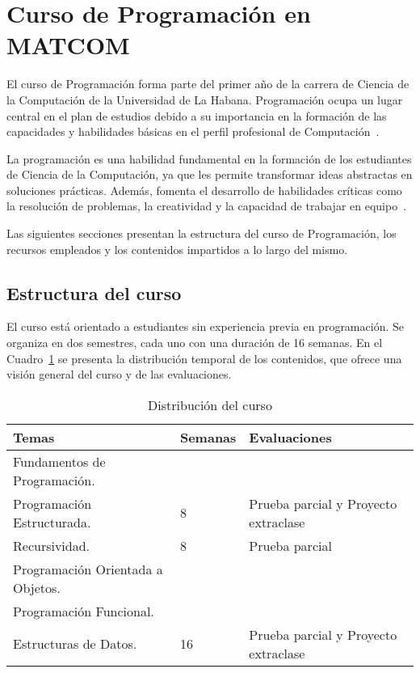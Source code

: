 \section{Curso de Programación en \mbox{MATCOM}}\label{sec:matcom}

El curso de Programación forma parte del primer año de la carrera de Ciencia de la Computación de la Universidad de La Habana. Programación ocupa un lugar central en el plan de estudios debido a su importancia en la formación de las capacidades y habilidades básicas en el perfil profesional de Computación~\cite{plan_estudio_e_2017}.

La programación es una habilidad fundamental en la formación de los estudiantes de Ciencia de la Computación, ya que les permite transformar ideas abstractas en soluciones prácticas. Además, fomenta el desarrollo de habilidades críticas como la resolución de problemas, la creatividad y la capacidad de trabajar en equipo~\cite{plan_estudio_e_2017}.

Las siguientes secciones presentan la estructura del curso de Programación, los recursos empleados y los contenidos impartidos a lo largo del mismo.

\subsection{Estructura del curso}

El curso está orientado a estudiantes sin experiencia previa en programación. Se organiza en dos semestres, cada uno con una duración de 16 semanas. En el Cuadro~\ref{tab:course_distribution} se presenta la distribución temporal de los contenidos, que ofrece una visión general del curso y de las evaluaciones.

\begin{table}[h!]
    \centering
    \begin{tabular}{|p{5cm}|p{2cm}|p{3cm}|}
    \hline
    \textbf{Temas} & \textbf{Semanas} & \textbf{Evaluaciones} \\ \hline
    \raggedright Fundamentos de Programación. \\ Programación Estructurada. 
    & 8 & Prueba parcial y Proyecto extraclase \\ \hline
    \raggedright Recursividad.
    & 8 & Prueba parcial \\ \hline
    \raggedright Programación Orientada a Objetos. \\ Programación Funcional. \\ Estructuras de Datos. 
    & 16 & Prueba parcial y Proyecto extraclase \\ \hline
    \end{tabular}
    \caption{Distribución del curso}\label{tab:course_distribution}
\end{table}
    

